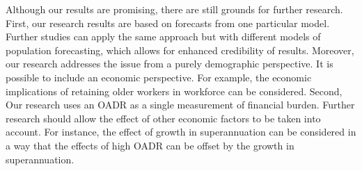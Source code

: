 \documentclass[11pt,a4paper,]{article}
\begin{document}
Although our results are promising, there are still grounds for further
research. First, our research results are based on forecasts from one
particular model. Further studies can apply the same approach but with
different models of population forecasting, which allows for enhanced
credibility of results. Moreover, our research addresses the issue from
a purely demographic perspective. It is possible to include an economic
perspective. For example, the economic implications of retaining older
workers in workforce can be considered. Second, Our research uses an
OADR as a single measurement of financial burden. Further research
should allow the effect of other economic factors to be taken into
account. For instance, the effect of growth in superannuation can be
considered in a way that the effects of high OADR can be offset by the
growth in superannuation.

\printbibliography
\end{document}
